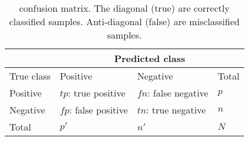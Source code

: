 \begin{table}[ht]
    \centering
    \begin{tabular}{ |l|l|l|l| }\hline
                    &   \multicolumn{3}{c|}{Predicted class}\\\hline
        True class  &  Positive             & Negative              & Total \\\hline
        Positive    & $tp$: true positive   & $fn$: false negative  & $p$   \\
        Negative    & $fp$: false positive  & $tn$: true negative   & $n$   \\\hline
        Total       & $p'$                  & $n'$                  & $N$   \\\hline
    \end{tabular}
    \caption[Definition - Confusion matrix]{confusion matrix. The diagonal (true) are correctly classified samples. Anti-diagonal (false) are misclassified samples.}
    \label{tab:confmat}
\end{table}